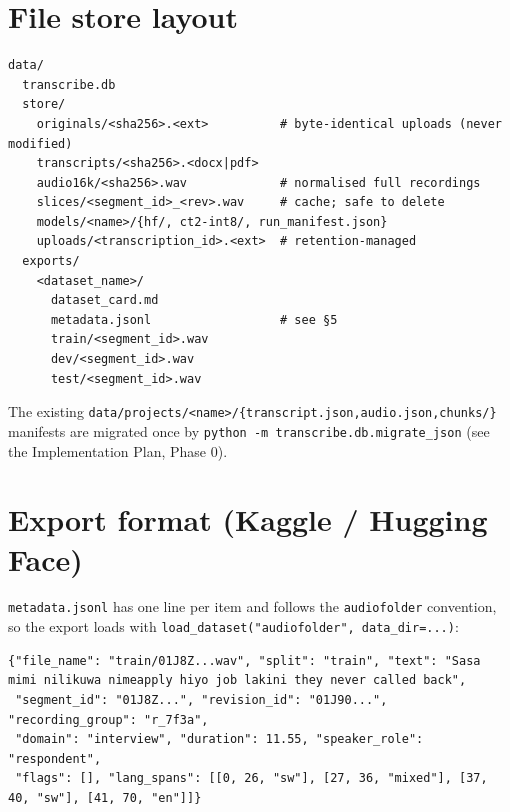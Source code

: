 \documentclass[11pt]{article}
\begin{document}
\hypertarget{file-store-layout}{%
\section{File store layout}\label{file-store-layout}}

\begin{lstlisting}
data/
  transcribe.db
  store/
    originals/<sha256>.<ext>          # byte-identical uploads (never modified)
    transcripts/<sha256>.<docx|pdf>
    audio16k/<sha256>.wav             # normalised full recordings
    slices/<segment_id>_<rev>.wav     # cache; safe to delete
    models/<name>/{hf/, ct2-int8/, run_manifest.json}
    uploads/<transcription_id>.<ext>  # retention-managed
  exports/
    <dataset_name>/
      dataset_card.md
      metadata.jsonl                  # see §5
      train/<segment_id>.wav
      dev/<segment_id>.wav
      test/<segment_id>.wav
\end{lstlisting}

The existing \texttt{data/\allowbreak{}projects/\allowbreak{}<name>/\allowbreak{}\{transcript.\allowbreak{}json,\allowbreak{}audio.\allowbreak{}json,\allowbreak{}chunks/\allowbreak{}\}} manifests are migrated once by \texttt{python -\allowbreak{}m transcribe.\allowbreak{}db.\allowbreak{}migrate\_\allowbreak{}json} (see the Implementation Plan, Phase 0).

\hypertarget{export-format-kaggle--hugging-face}{%
\section{Export format (Kaggle / Hugging Face)}\label{export-format-kaggle--hugging-face}}

\texttt{metadata.\allowbreak{}jsonl} has one line per item and follows the \texttt{audiofolder} convention, so the export loads with \texttt{load\_\allowbreak{}dataset("audiofolder",\allowbreak{} data\_\allowbreak{}dir=\allowbreak{}.\allowbreak{}.\allowbreak{}.\allowbreak{})}:

\begin{lstlisting}
{"file_name": "train/01J8Z...wav", "split": "train", "text": "Sasa mimi nilikuwa nimeapply hiyo job lakini they never called back",
 "segment_id": "01J8Z...", "revision_id": "01J90...", "recording_group": "r_7f3a",
 "domain": "interview", "duration": 11.55, "speaker_role": "respondent",
 "flags": [], "lang_spans": [[0, 26, "sw"], [27, 36, "mixed"], [37, 40, "sw"], [41, 70, "en"]]}
\end{lstlisting}
\end{document}
